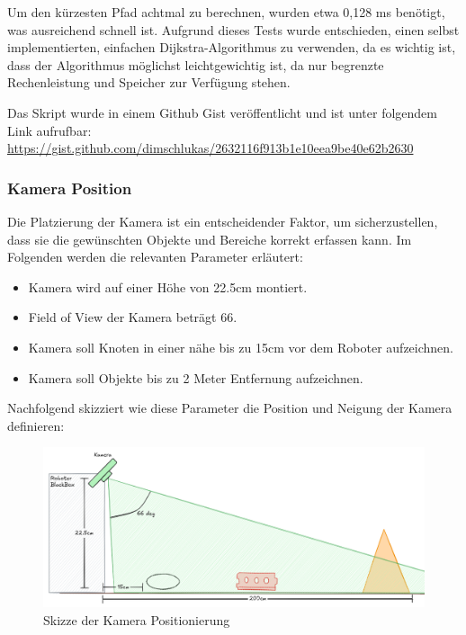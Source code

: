 Um den kürzesten Pfad achtmal zu berechnen, wurden etwa 0,128 ms benötigt, was ausreichend schnell ist. Aufgrund dieses Tests wurde entschieden, einen selbst implementierten, einfachen Dijkstra-Algorithmus zu verwenden, da es wichtig ist, dass der Algorithmus möglichst leichtgewichtig ist, da nur begrenzte Rechenleistung und Speicher zur Verfügung stehen.

Das Skript wurde in einem Github Gist veröffentlicht und ist unter folgendem Link aufrufbar: \url{https://gist.github.com/dimschlukas/2632116f913b1e10eea9be40e62b2630}

\subsubsection{Kamera Position}\label{camera-position}

Die Platzierung der Kamera ist ein entscheidender Faktor, um sicherzustellen, dass sie die gewünschten Objekte und Bereiche korrekt erfassen kann. Im Folgenden werden die relevanten Parameter erläutert:

\begin{itemize}
    \item Kamera wird auf einer Höhe von 22.5cm montiert.
    \item Field of View der Kamera beträgt 66\textdegree.
    \item Kamera soll Knoten in einer nähe bis zu 15cm vor dem Roboter aufzeichnen.
    \item Kamera soll Objekte bis zu 2 Meter Entfernung aufzeichnen.
\end{itemize}

Nachfolgend skizziert wie diese Parameter die Position und Neigung der Kamera definieren:

\begin{figure}[H]
    \centering
    \includegraphics[width=1\linewidth]{assets/informatik-prototyp/camera/camera_position.png}
    \caption{Skizze der Kamera Positionierung}
    \label{fig:camera-position}
\end{figure}

